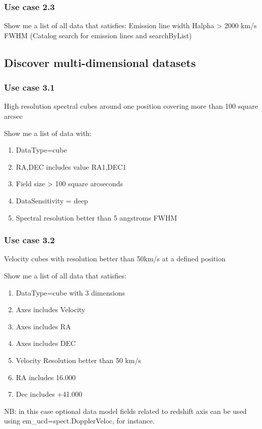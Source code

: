 \documentclass[11pt,a4paper]{ivoa}
\begin{document}
\subsubsection{Use case 2.3}
Show me a list of all data that satisfies: Emission line width Halpha {\textgreater} 2000 km/s FWHM (Catalog search for
emission lines and searchByList)

\subsection{Discover multi-dimensional datasets}
\subsubsection{Use case 3.1}
High resolution spectral cubes around one position covering more than 100 square arcsec

Show me a list of data with:

\begin{enumerate}
\item DataType=cube
\item RA,DEC includes value RA1,DEC1
\item Field size {\textgreater} 100 square arcseconds
\item DataSensitivity = deep
\item Spectral resolution better than 5 angstroms FWHM
\end{enumerate}
\subsubsection{Use case 3.2}
Velocity cubes with resolution better than 50km/s at a defined position

Show me a list of all data that satisfies:

\begin{enumerate}
\item DataType=cube with 3 dimensions
\item Axes includes Velocity\ \ \ \
\item Axes includes RA
\item Axes includes DEC
\item Velocity Resolution better than 50 km/s
\item RA includes 16.000
\item Dec includes +41.000
\end{enumerate}
NB: in this case optional data model fields related to redshift axis can be used using  em\_ucd=spect.DopplerVeloc, for
instance.
\end{document}
